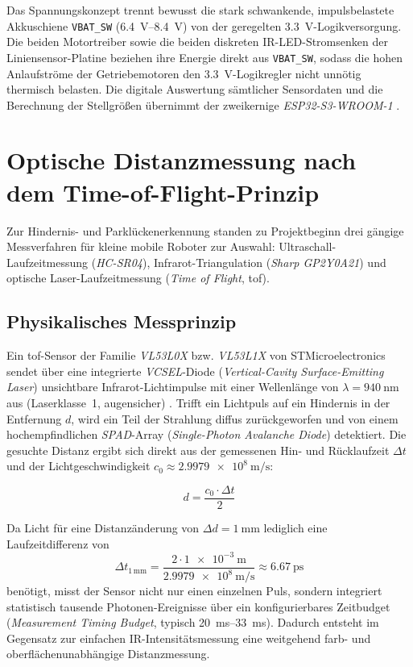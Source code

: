 Das Spannungskonzept trennt bewusst die stark schwankende, impulsbelastete Akkuschiene \texttt{VBAT\_SW} (\qtyrange{6,4}{8,4}{\volt}) von der geregelten \qty{3,3}{\volt}-Logikversorgung. Die beiden Motortreiber sowie die beiden diskreten IR-LED-Stromsenken der Liniensensor-Platine beziehen ihre Energie direkt aus \texttt{VBAT\_SW}, sodass die hohen Anlaufströme der Getriebemotoren den \qty{3,3}{\volt}-Logikregler nicht unnötig thermisch belasten. Die digitale Auswertung sämtlicher Sensordaten und die Berechnung der Stellgrößen übernimmt der zweikernige \emph{ESP32-S3-WROOM-1} \cite{EspressifESP32S3}.

\section{Optische Distanzmessung nach dem Time-of-Flight-Prinzip}
\label{sec:tof_grundlagen}
Zur Hindernis- und Parklückenerkennung standen zu Projektbeginn drei gängige Messverfahren für kleine mobile Roboter zur Auswahl: Ultraschall-Laufzeitmessung (\emph{HC-SR04}), Infrarot-Triangulation (\emph{Sharp GP2Y0A21}) und optische Laser-Laufzeitmessung (\emph{Time of Flight}, \gls{tof}).

\subsection{Physikalisches Messprinzip}
Ein \gls{tof}-Sensor der Familie \emph{VL53L0X} bzw. \emph{VL53L1X} von STMicroelectronics sendet über eine integrierte \emph{VCSEL}-Diode (\emph{Vertical-Cavity Surface-Emitting Laser}) unsichtbare Infrarot-Lichtimpulse mit einer Wellenlänge von $\lambda = \qty{940}{\nano\meter}$ aus (Laserklasse~1, augensicher) \cite{ST_VL53L0X,ST_VL53L1X}. Trifft ein Lichtpuls auf ein Hindernis in der Entfernung $d$, wird ein Teil der Strahlung diffus zurückgeworfen und von einem hochempfindlichen \emph{SPAD}-Array (\emph{Single-Photon Avalanche Diode}) detektiert. Die gesuchte Distanz ergibt sich direkt aus der gemessenen Hin- und Rücklaufzeit $\Delta t$ und der Lichtgeschwindigkeit $c_0 \approx \qty{2,9979e8}{\meter\per\second}$:

\begin{equation}
  d = \frac{c_0 \cdot \Delta t}{2}
  \label{eq:tof_distanz}
\end{equation}

Da Licht für eine Distanzänderung von $\Delta d = \qty{1}{\milli\meter}$ lediglich eine Laufzeitdifferenz von
\begin{equation}
  \Delta t_{1\,\mathrm{mm}} = \frac{2 \cdot \qty{1e-3}{\meter}}{\qty{2,9979e8}{\meter\per\second}} \approx \qty{6,67}{\pico\second}
  \label{eq:tof_zeit}
\end{equation}
benötigt, misst der Sensor nicht nur einen einzelnen Puls, sondern integriert statistisch tausende Photonen-Ereignisse über ein konfigurierbares Zeitbudget (\emph{Measurement Timing Budget}, typisch \qtyrange{20}{33}{\milli\second}). Dadurch entsteht im Gegensatz zur einfachen IR-Intensitätsmessung eine weitgehend farb- und oberflächenunabhängige Distanzmessung.

